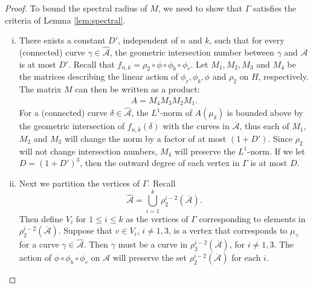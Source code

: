 \begin{proof}
To bound the spectral radius of $M$, we need to show that $\Gamma$ satisfies
the criteria of Lemma \ref{lem:spectral}.


\begin{enumerate}[(i)]
\item There exists a constant $D'$, independent of $n$ and
  $k$, such that for every (connected) curve $\gamma \in \widehat{\mathcal{A}}$, the geometric
  intersection number between $\gamma$ and $\overline{\mathcal{A}}$ is at most $D'$. %
  Recall that $f_{n,k}=\rho_2\circ\phi\circ\phi_b\circ\phi_r$.  Let $M_1,M_2,M_3$ and $M_4$ be the matrices describing the linear action of $\phi_r,\phi_b,\phi$ and $\rho_2$ on $H$, respectively. The matrix
  $M$ can then be written as a product:
  \begin{align*}
    A = M_4M_3M_2M_1.
  \end{align*}
  For a (connected)
  curve $\delta \in \hat{\mathcal{A}}$, the $L^1$-norm of $A(\mu_\delta)$ is bounded above by the geometric intersection of
  $f_{n,k}(\delta)$ with the curves in $\overline{\mathcal{A}}$, thus each of $M_1$, $M_2$ and $M_3$ will change the norm by
  a factor of at most $(1 + D')$. Since $\rho_2$ will not change intersection numbers, $M_4$ will preserve the
  $L^1$-norm. If we let $D = (1 + D')^3$, then the outward degree of each vertex in $\Gamma$ is at most $D$.
\item  Next we partition the vertices of $\Gamma$.  Recall
$$\widehat{\mathcal{A}} = \bigcup_{i=1}^k \rho_2^{i-2}(\overline{\mathcal{A}}).$$ Then define $V_i$ for
$1 \leq i \leq k$ as the vertices of $\Gamma$ corresponding to elements in
$\rho_2^{i-2}(\overline{\mathcal{A}})$.  Suppose that $v \in V_i$, $i \neq 1,3$, is a vertex
  that corresponds to $\mu_\gamma$ for a curve $\gamma \in \hat{\mathcal{A}}$. Then $\gamma$ must be a curve
  in $\rho_2^{i-2}(\overline{\mathcal{A}})$, for $i \neq 1,3$.  The action of $\phi\circ\phi_b \circ \phi_r$ on $\widehat{\mathcal{A}}$ will preserve the set $\rho_2^{i-2}(\overline{\mathcal{A}})$ for each $i$.  %

\end{enumerate}
\end{proof}
